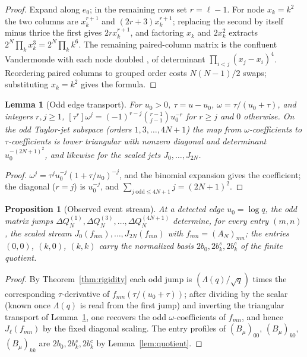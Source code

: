 \documentclass[11pt]{article}
\theoremstyle{plain}
\newtheorem{proposition}[theorem]{Proposition}
\newtheorem{lemma}[theorem]{Lemma}
\theoremstyle{definition}
\theoremstyle{remark}
\newcommand{\Lam}{\Lambda}
\begin{document}
\begin{proof}
Expand along $e_0$; in the remaining rows set $r=\ell-1$. For node $x_k=k^2$ the
two columns are $x_k^{r+1}$ and $(2r+3)x_k^{r+1}$; replacing the second by
itself minus thrice the first gives $2r x_k^{r+1}$, and factoring $x_k$ and
$2x_k^2$ extracts $2^N\prod_k x_k^3=2^N\prod_k k^6$. The remaining paired-column
matrix is the confluent Vandermonde with each node doubled
\cite{Gautschi1962}, of determinant $\prod_{i<j}(x_j-x_i)^4$. Reordering paired
columns to grouped order costs $N(N-1)/2$ swaps; substituting $x_k=k^2$ gives the
formula.
\end{proof}

\begin{lemma}[Odd edge transport]\label{lem:transport}
For $u_0>0$, $\tau=u-u_0$, $\omega=\tau/(u_0+\tau)$, and integers $r,j\ge1$,
$[\tau^r]\omega^j=(-1)^{r-j}\binom{r-1}{j-1}u_0^{-r}$ for $r\ge j$ and $0$
otherwise. On the odd Taylor-jet subspace (orders $1,3,\dots,4N+1$) the map from
$\omega$-coefficients to $\tau$-coefficients is lower triangular with nonzero
diagonal and determinant $u_0^{-(2N+1)^2}$, and likewise for the scaled jets
$J_0,\dots,J_{2N}$.
\end{lemma}

\begin{proof}
$\omega^j=\tau^ju_0^{-j}(1+\tau/u_0)^{-j}$, and the binomial expansion gives the
coefficient; the diagonal ($r=j$) is $u_0^{-j}$, and
$\sum_{j\ \mathrm{odd}\le 4N+1}j=(2N+1)^2$.
\end{proof}

\begin{proposition}[Observed event stream]\label{prop:stream}
At a detected edge $u_0=\log q$, the odd matrix jumps $\Delta Q_N^{(1)},
\Delta Q_N^{(3)},\dots,\Delta Q_N^{(4N+1)}$ determine, for every entry
$(m,n)$, the scaled stream $J_0(f_{mn}),\dots,J_{2N}(f_{mn})$ with
$f_{mn}=(A_N)_{mn}$; the entries $(0,0)$, $(k,0)$, $(k,k)$ carry the normalized
basis $2b_0,2b_k^s,2b_k^c$ of the finite quotient.
\end{proposition}

\begin{proof}
By Theorem~\ref{thm:rigidity} each odd jump is $(\Lam(q)/\sqrt q)$ times the
corresponding $\tau$-derivative of $f_{mn}(\tau/(u_0+\tau))$; after dividing by
the scalar (known once $\Lam(q)$ is read from the first jump) and inverting the
triangular transport of Lemma~\ref{lem:transport}, one recovers the odd
$\omega$-coefficients of $f_{mn}$, and hence $J_\ell(f_{mn})$ by the fixed
diagonal scaling. The entry profiles of $(B_\mu)_{00}$, $(B_\mu)_{k0}$,
$(B_\mu)_{kk}$ are $2b_0,2b_k^s,2b_k^c$ by Lemma~\ref{lem:quotient}.
\end{proof}
\end{document}
